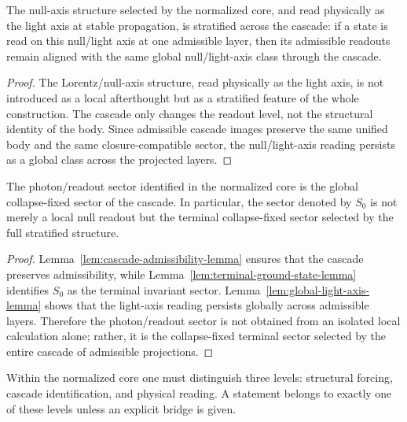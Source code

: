 \begin{lemma}
\label{lem:global-light-axis-lemma}
The null-axis structure selected by the normalized core, and read physically as the light axis at stable propagation, is stratified across
the cascade: if a state is read on this null/light axis at one admissible layer, then
its admissible readouts remain aligned with the same global null/light-axis class
through the cascade.
\end{lemma}

\begin{proof}
The Lorentz/null-axis structure, read physically as the light axis, is not introduced as a local afterthought but
as a stratified feature of the whole construction. The cascade only changes the
readout level, not the structural identity of the body. Since admissible
cascade images preserve the same unified body and the same closure-compatible
sector, the null/light-axis reading persists as a global class across the projected
layers.
\end{proof}

\begin{theorem}
\label{thm:collapse-fixed-sector-theorem}
The photon/readout sector identified in the normalized core is the global
collapse-fixed sector of the cascade. In particular, the sector denoted by
$S_0$ is not merely a local null readout but the terminal collapse-fixed sector
selected by the full stratified structure.
\end{theorem}

\begin{proof}
Lemma~\ref{lem:cascade-admissibility-lemma} ensures that the cascade preserves
admissibility, while Lemma~\ref{lem:terminal-ground-state-lemma} identifies
$S_0$ as the terminal invariant sector. Lemma~\ref{lem:global-light-axis-lemma}
shows that the light-axis reading persists globally across admissible layers.
Therefore the photon/readout sector is not obtained from an isolated local
calculation alone; rather, it is the collapse-fixed terminal sector selected by
the entire cascade of admissible projections.
\end{proof}

\begin{lemma}
\label{lem:readout-separation-lemma}
Within the normalized core one must distinguish three levels: structural
forcing, cascade identification, and physical reading. A statement belongs to
exactly one of these levels unless an explicit bridge is given.
\end{lemma}

